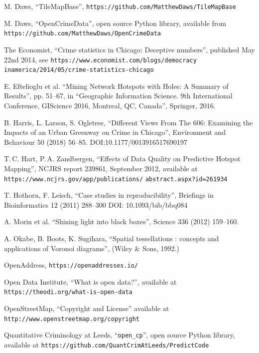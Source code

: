 \documentclass[twoside,a4paper,twocolumn,10pt]{article}
\theoremstyle{plain}
\theoremstyle{definition}
\begin{document}
\begin{thebibliography}{99}
 M. Daws, ``TileMapBase'',
   {\small\texttt{https://github.com/MatthewDaws/TileMapBase}}

 M. Daws, ``OpenCrimeData'', open source Python library, available from
   \texttt{https://github.com/MatthewDaws/OpenCrimeData}

 The Economist, ``Crime statistics in Chicago: Deceptive numbers'', published
  May 22nd 2014, see
  {\small\texttt{https://www.economist.com/blogs/democracy}
   \texttt{inamerica/2014/05/crime-statistics-chicago}}

 E. Eftelioglu et al. ``Mining Network Hotspots with Holes: A Summary of Results'',
  pp. 51--67, in ``Geographic Information Science.  9th International Conference, GIScience 2016, Montreal, QC, Canada'',
  Springer, 2016.

 B. Harris, L. Larson, S. Ogletree,
  ``Different Views From The 606: Examining the Impacts of an Urban Greenway on Crime in Chicago'',
  Environment and Behaviour 50 (2018) 56--85.  DOI:10.1177/0013916517690197

 T.\,C. Hart, P.\,A. Zandbergen,
  ``Effects of Data Quality on Predictive Hotspot Mapping'',
  NCJRS report 239861, September 2012, available at
  {\small
  \texttt{https://www.ncjrs.gov/app/publications/}
   \texttt{abstract.aspx?id=261934}}

 T. Hothorn, F. Leisch, ``Case studies in reproducibility'',
  Briefings in Bioinformatics 12 (2011) 288--300 DOI: 10.1093/bib/bbq084

 A. Morin et al. ``Shining light into black boxes'',
  Science 336 (2012) 159--160.

 A. Okabe, B. Boots, K. Sugihara,
  ``Spatial tessellations : concepts and applications of Voronoi diagrams'',
  (Wiley \& Sons, 1992.)

 OpenAddress, {\small\texttt{https://openaddresses.io/}}

 Open Data Institute, ``What is open data?'', available at
   {\small\texttt{https://theodi.org/what-is-open-data}}

 OpenStreetMap, ``Copyright and License'' available at
   {\small\texttt{http://www.openstreetmap.org/copyright}}

 Quantitative Criminology at Leeds, ``\texttt{open\_cp}'',
   open source Python library, available at \texttt{https://github.com/QuantCrimAtLeeds/PredictCode}


\end{thebibliography}
\end{document}

